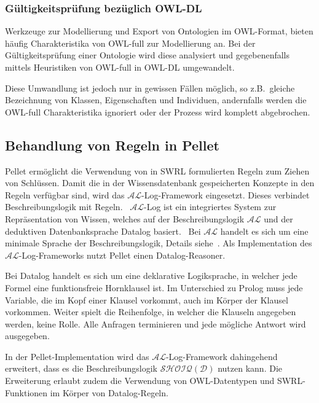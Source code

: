 \subsubsection{Gültigkeitsprüfung bezüglich OWL-DL}
\label{ssubsection:inferenz_pellet_owldl}
Werkzeuge zur Modellierung und Export von Ontologien im OWL-Format, bieten häufig Charakteristika von OWL-full zur Modellierung an. Bei der Gültigkeitsprüfung einer Ontologie wird diese analysiert und gegebenenfalls mittels Heuristiken von OWL-full in OWL-DL umgewandelt.

Diese Umwandlung ist jedoch nur in gewissen Fällen möglich, so z.B.\ gleiche Bezeichnung von Klassen, Eigenschaften und Individuen, andernfalls werden die OWL-full Charakteristika ignoriert oder der Prozess wird komplett abgebrochen.

\subsection{Behandlung von Regeln in Pellet}
\label{subsection:inferenz_pellet_swrl}
Pellet ermöglicht die Verwendung von in SWRL formulierten Regeln zum Ziehen von Schlüssen. Damit die in der Wissensdatenbank gespeicherten Konzepte in den Regeln verfügbar sind, wird das $\mathcal{AL}$-Log-Framework eingesetzt. Dieses verbindet Beschreibungslogik mit Regeln.~\cite[Seiten 4 und 5]{sirin:pellet07} $\mathcal{AL}$-Log ist ein integriertes System zur Repräsentation von Wissen, welches auf der Beschreibungslogik $\mathcal{AL}$ und der deduktiven Datenbanksprache Datalog basiert.~\cite{allog} Bei $\mathcal{AL}$ handelt es sich um eine minimale Sprache der Beschreibungslogik, Details siehe~\cite[Seite 51]{dl:baader2003}. Als Implementation des $\mathcal{AL}$-Log-Frameworks nutzt Pellet einen Datalog-Reasoner.~\cite[Seiten 4 und 5]{sirin:pellet07}

Bei Datalog handelt es sich um eine deklarative Logiksprache, in welcher jede Formel eine funktionsfreie Hornklausel ist. Im Unterschied zu Prolog muss jede Variable, die im Kopf einer Klausel vorkommt, auch im Körper der Klausel vorkommen. Weiter spielt die Reihenfolge, in welcher die Klauseln angegeben werden, keine Rolle. Alle Anfragen terminieren und jede mögliche Antwort wird ausgegeben.~\cite{datalog}

In der Pellet-Implementation wird das $\mathcal{AL}$-Log-Framework dahingehend erweitert, dass es die Beschreibungslogik $\mathcal{SHOIQ}(\mathcal{D})$ nutzen kann. Die Erweiterung erlaubt zudem die Verwendung von OWL-Datentypen und SWRL-Funktionen im Körper von Datalog-Regeln.~\cite[Seite 5]{sirin:pellet07}

